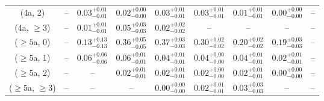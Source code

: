 \begin{table}[h!]
{\begin{tabular}{ccccccccc}
	(4a, 2) & -- & $0.03^{+ 0.01 }_{- 0.01 }$ & $0.02^{+ 0.00 }_{- 0.00 }$ & $0.03^{+ 0.01 }_{- 0.01 }$ & $0.03^{+ 0.01 }_{- 0.01 }$ & $0.01^{+ 0.01 }_{- 0.01 }$ & $0.00^{+ 0.00 }_{- 0.00 }$ & -- \\[0.5ex] 
	(4a, $\ge3$) & -- & $0.01^{+ 0.01 }_{- 0.01 }$ & $0.05^{+ 0.03 }_{- 0.03 }$ & $0.02^{+ 0.02 }_{- 0.02 }$ & -- & -- & -- & -- \\[0.5ex] 
	($\ge5$a, 0) & -- & $0.13^{+ 0.13 }_{- 0.13 }$ & $0.36^{+ 0.05 }_{- 0.05 }$ & $0.37^{+ 0.03 }_{- 0.03 }$ & $0.30^{+ 0.02 }_{- 0.02 }$ & $0.20^{+ 0.02 }_{- 0.02 }$ & $0.19^{+ 0.03 }_{- 0.03 }$ & -- \\[0.5ex] 
	($\ge5$a, 1) & -- & $0.06^{+ 0.06 }_{- 0.06 }$ & $0.06^{+ 0.01 }_{- 0.01 }$ & $0.04^{+ 0.01 }_{- 0.01 }$ & $0.04^{+ 0.00 }_{- 0.00 }$ & $0.04^{+ 0.01 }_{- 0.01 }$ & $0.02^{+ 0.01 }_{- 0.01 }$ & -- \\[0.5ex] 
	($\ge5$a, 2) & -- & -- & $0.02^{+ 0.01 }_{- 0.01 }$ & $0.02^{+ 0.01 }_{- 0.01 }$ & $0.02^{+ 0.00 }_{- 0.00 }$ & $0.02^{+ 0.01 }_{- 0.01 }$ & $0.00^{+ 0.00 }_{- 0.00 }$ & -- \\[0.5ex] 
	($\ge5$a, $\ge3$) & -- & -- & -- & $0.00^{+ 0.00 }_{- 0.00 }$ & $0.02^{+ 0.01 }_{- 0.01 }$ & $0.03^{+ 0.03 }_{- 0.03 }$ & -- & -- \\[0.5ex] 
	\hline
	\hline
\end{tabular}}
\end{table}

